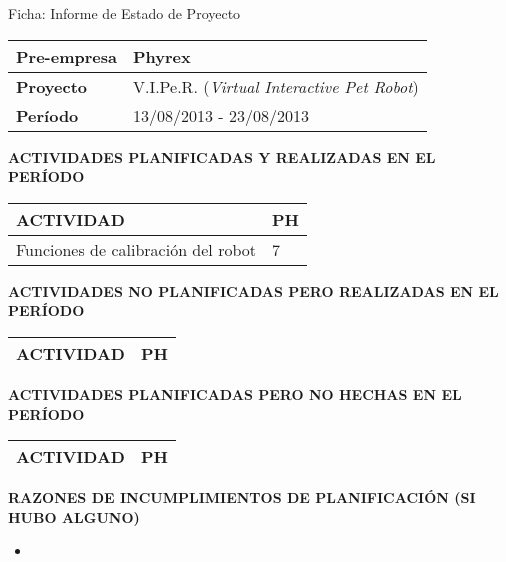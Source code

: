 \documentclass[10pt,letter]{article}
\begin{document}
\vspace{4cm}
\begin{center}
  {\huge Ficha: Informe de Estado de Proyecto}
\end{center}

\vspace{-0,2cm}
\begin{table}[H]
\centering
  \begin{tabular}{|l|p{12cm}|}\hline
    {\bf Pre-empresa} & Phyrex \\ \hline
    {\bf Proyecto} & V.I.Pe.R. (\emph{Virtual Interactive Pet Robot}) \\ \hline
    {\bf Per\'iodo} & 13/08/2013 - 23/08/2013 \\\hline
  \end{tabular}
\end{table}

\vspace{0,5cm}
{\bf ACTIVIDADES PLANIFICADAS Y REALIZADAS EN EL PER\'IODO}
\begin{table}[H]
\centering
  \begin{tabular}{|p{12cm}|l|}\hline
    {\bf ACTIVIDAD} & {\bf PH} \\ \hline
    Funciones de calibraci\'on del robot & 7 \\ \hline
  \end{tabular}
\end{table}

\vspace{0,5cm}
{\bf ACTIVIDADES NO PLANIFICADAS PERO REALIZADAS EN EL PER\'IODO}
\begin{table}[H]
\centering
  \begin{tabular}{|p{12cm}|l|}\hline
    {\bf ACTIVIDAD} & {\bf PH} \\ \hline
    
  \end{tabular}
\end{table}

\vspace{0,5cm}
{\bf ACTIVIDADES PLANIFICADAS PERO NO HECHAS EN EL PER\'IODO}
\begin{table}[H]
\centering
  \begin{tabular}{|p{12cm}|l|}\hline
    {\bf ACTIVIDAD} & {\bf PH} \\ \hline
    
  \end{tabular}
\end{table}

\vspace{0,5cm}
{\bf RAZONES DE INCUMPLIMIENTOS DE PLANIFICACI\'ON (SI HUBO ALGUNO)}
\begin{itemize}
\item 
\end{itemize}
\end{document}
